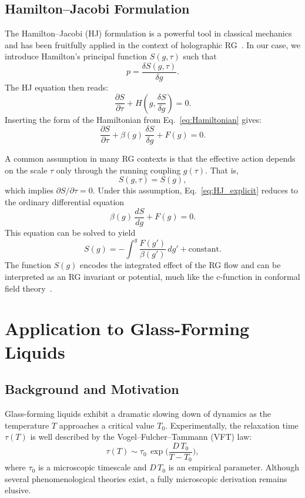 \documentclass[12pt]{article}
\begin{document}
\subsection{Hamilton--Jacobi Formulation}
The Hamilton--Jacobi (HJ) formulation is a powerful tool in classical mechanics and has been fruitfully applied in the context of holographic RG~\cite{deBoer1999holographic}. In our case, we introduce Hamilton's principal function \(S(g,\tau)\) such that
\begin{equation} \label{eq:pS}
p = \frac{\delta S(g,\tau)}{\delta g}.
\end{equation}
The HJ equation then reads:
\begin{equation} \label{eq:HJ}
\frac{\partial S}{\partial \tau} + H\!\left(g,\frac{\delta S}{\delta g}\right) = 0.
\end{equation}
Inserting the form of the Hamiltonian from Eq.~\eqref{eq:Hamiltonian} gives:
\begin{equation} \label{eq:HJ_explicit}
\frac{\partial S}{\partial \tau} + \beta(g)\,\frac{\delta S}{\delta g} + F(g) = 0.
\end{equation}

A common assumption in many RG contexts is that the effective action depends on the scale \(\tau\) only through the running coupling \(g(\tau)\). That is,
\[
S(g,\tau) = S(g),
\]
which implies \(\partial S/\partial \tau = 0\). Under this assumption, Eq.~\eqref{eq:HJ_explicit} reduces to the ordinary differential equation
\begin{equation} \label{eq:HJ_reduced}
\beta(g)\,\frac{dS}{dg} + F(g) = 0.
\end{equation}
This equation can be solved to yield
\begin{equation} \label{eq:Seff}
S(g) = -\int^{g} \frac{F(g')}{\beta(g')}\,dg' + \text{constant}.
\end{equation}
The function \(S(g)\) encodes the integrated effect of the RG flow and can be interpreted as an RG invariant or potential, much like the c-function in conformal field theory~\cite{zamolodchikov1986irreversibility}.

\section{Application to Glass-Forming Liquids} \label{sec:application}
\subsection{Background and Motivation}
Glass-forming liquids exhibit a dramatic slowing down of dynamics as the temperature \(T\) approaches a critical value \(T_0\). Experimentally, the relaxation time \(\tau(T)\) is well described by the Vogel--Fulcher--Tammann (VFT) law:
\begin{equation} \label{eq:VFT}
\tau(T) \sim \tau_0\, \exp\!\Biggl(\frac{D\, T_0}{T-T_0}\Biggr),
\end{equation}
where \(\tau_0\) is a microscopic timescale and \(D\,T_0\) is an empirical parameter. Although several phenomenological theories exist, a fully microscopic derivation remains elusive.
\end{document}
